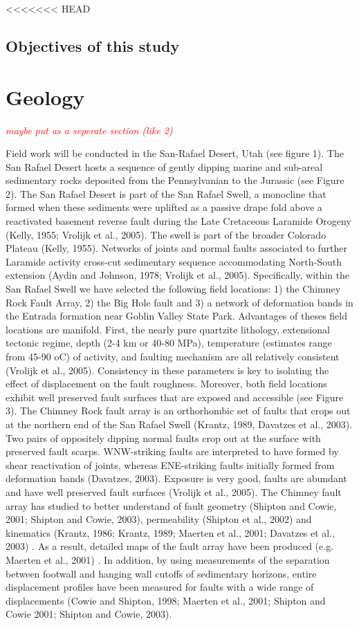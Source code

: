 \documentclass[12pt,a4paper]{article}
\begin{document}
<<<<<<< HEAD
\subsection{Objectives of this study}

\section{Geology}

\textcolor{red}{\textit{maybe put as a seperate section (like 2)}}

Field work will be conducted in the San-Rafael Desert, Utah (see figure 1). The San Rafael Desert hosts a sequence of gently dipping marine and sub-areal sedimentary rocks deposited from the Pennsylvanian to the Jurassic (see Figure 2). 
The San Rafael Desert is part of the San Rafael Swell, a monocline that formed when these sediments were uplifted as a passive drape fold above a reactivated basement reverse fault during the Late Cretaceous Laramide Orogeny (Kelly, 1955; Vrolijk et al., 2005). The swell is part of the broader Colorado Plateau (Kelly, 1955). Networks of joints and normal faults associated to further Laramide activity cross-cut sedimentary sequence accommodating North-South extension (Aydin and Johnson, 1978; Vrolijk et al., 2005). Specifically, within the San Rafael Swell we have selected the following field locations: 1) the Chimney Rock Fault Array, 2) the Big Hole fault and 3) a network of deformation bands in the Entrada formation near Goblin Valley State Park.  Advantages of theses field locations are manifold. First, the nearly pure quartzite lithology, extensional tectonic regime, depth (2-4 km or 40-80 MPa), temperature (estimates range from 45-90 oC) of activity, and faulting mechanism are all relatively consistent (Vrolijk et al., 2005). Consistency in these parameters is key to isolating the effect of displacement on the fault roughness. Moreover, both field locations exhibit well preserved fault surfaces that are exposed and accessible (see Figure 3). 
The Chimney Rock fault array is an orthorhombic set of faults that crops out at the northern end of the San Rafael Swell (Krantz, 1989, Davatzes et al., 2003). Two pairs of oppositely dipping normal faults crop out at the surface with preserved fault scarps. WNW-striking faults are interpreted to have formed by shear reactivation of joints, whereas ENE-striking faults initially formed from deformation bands (Davatzes, 2003). Exposure is very good, faults are abundant and have well preserved fault surfaces (Vrolijk et al., 2005). The Chimney fault array has studied to better understand of fault geometry (Shipton and Cowie, 2001; Shipton and Cowie, 2003), permeability (Shipton et al., 2002) and kinematics (Krantz, 1986; Krantz, 1989; Maerten et al., 2001; Davatzes et al., 2003) . As a result, detailed maps of the fault array have been produced (e.g. Maerten et al., 2001) . In addition, by using measurements of the separation between footwall and hanging wall cutoffs of sedimentary horizons, entire displacement profiles have been measured for faults with a wide range of displacements (Cowie and Shipton, 1998; Maerten et al., 2001; Shipton and Cowie 2001; Shipton and Cowie, 2003). 
\end{document}
